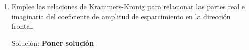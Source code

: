 \begin{enumerate}[label=\textbf{Ejercicio \thechapter.\arabic*},resume]
\item Emplee las relaciones de Krammers-Kronig para relacionar las partes real e imaginaria del coeficiente de amplitud de esparcimiento en la dirección frontal.
\label{ex:KrammersKronigA}
\item[\color{blue} Solución:]
{\color{red}\textbf{Poner solución}}
\end{enumerate}




















